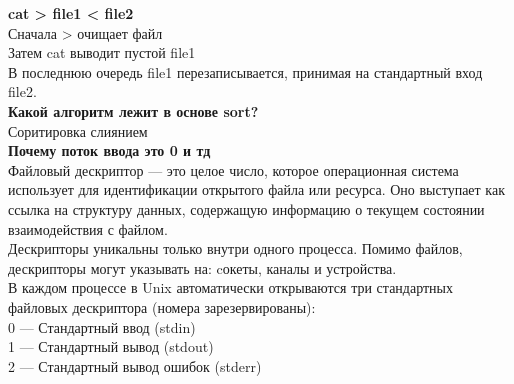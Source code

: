 \noindent \textbf{cat > file1 < file2} \\
Сначала > очищает файл \\
Затем cat выводит пустой file1 \\
В последнюю очередь file1 перезаписывается, принимая на стандартный вход file2. \\

\noindent \textbf{Какой алгоритм лежит в основе sort?} \\
Соритировка слиянием \\

\noindent \textbf{Почему поток ввода это 0 и тд} \\
Файловый дескриптор — это целое число, которое операционная система использует для идентификации открытого файла или ресурса. Оно выступает как ссылка на структуру данных, содержащую информацию о текущем состоянии взаимодействия с файлом. \\
Дескрипторы уникальны только внутри одного процесса.
Помимо файлов, дескрипторы могут указывать на: cокеты, каналы и  устройства. \\
В каждом процессе в Unix автоматически открываются три стандартных файловых дескриптора (номера зарезервированы): \\
0 — Стандартный ввод (stdin) \\ 
1 — Стандартный вывод (stdout) \\
2 — Стандартный вывод ошибок (stderr) 

